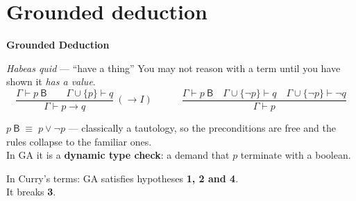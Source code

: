 \documentclass[aspectratio=169,11pt]{beamer}
\newcommand{\key}[1]{{\color{accent}\textbf{#1}}}
\begin{document}
\section{Grounded deduction}

\begin{frame}[plain]
  \vfill
  \begin{center}
    {\Huge\bfseries\color{accent} Grounded Deduction}
  \end{center}
  \vfill
\end{frame}

\begin{frame}{\emph{Habeas quid} --- ``have a thing''}
  \vfill
  You may not reason with a term until you have shown it \emph{has a value}.
  \vfill
  \[
    \frac{\Gamma \vdash p\ \mathsf{B} \qquad \Gamma \cup \{p\} \vdash q}
         {\Gamma \vdash p \to q}\ (\to I)
    \qquad\quad
    \frac{\Gamma \vdash p\ \mathsf{B} \quad \Gamma\cup\{\neg p\} \vdash q
          \quad \Gamma\cup\{\neg p\} \vdash \neg q}
         {\Gamma \vdash p}
  \]
  \vfill
  \begin{center}\small
    $p\ \mathsf{B} \;\equiv\; p \vee \neg p$ --- classically a tautology, so the
    preconditions are free and the rules collapse to the familiar ones.\\[0.4em]
    In GA it is a \key{dynamic type check}: a demand that $p$ terminate with a boolean.
  \end{center}
  \vfill
  \begin{center}
    In Curry's terms: GA satisfies hypotheses \key{1, 2 and 4}.\\
    It breaks \key{3}.
  \end{center}
\end{frame}
\end{document}
